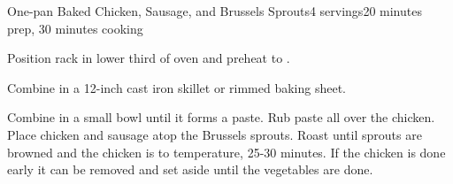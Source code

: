 \documentclass[../Cookbook.tex]{subfiles}
\begin{document}
\begin{recipe}{One-pan Baked Chicken, Sausage, and Brussels Sprouts}{4 servings}{20 minutes prep, 30 minutes cooking}

Position rack in lower third of oven and preheat to .

Combine in a 12-inch cast iron skillet or rimmed baking sheet.

Combine in a small bowl until it forms a paste. Rub paste all over the chicken. Place chicken and sausage atop the Brussels sprouts. Roast until sprouts are browned and the chicken is to temperature, 25-30 minutes. If the chicken is done early it can be removed and set aside until the vegetables are done.


\end{recipe}
\end{document}
